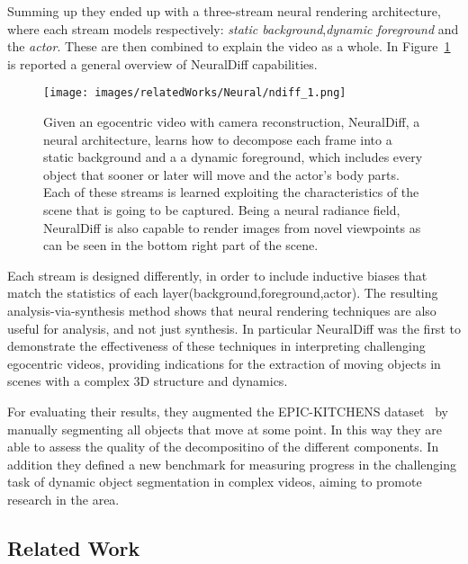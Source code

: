 Summing up they ended up with a three-stream neural rendering architecture, where each stream
models respectively: \textit{static background},\textit{dynamic foreground} and
the \textit{actor}. These are then combined to explain the video as a whole. In Figure~\ref{fig:ndiff_1}
is reported a general overview of NeuralDiff capabilities.
\begin{figure}[H]
    \centering
    \texttt{[image: images/relatedWorks/Neural/ndiff\_1.png]} 
    \caption{Given an egocentric video with camera reconstruction, NeuralDiff, a neural
    architecture, learns how to decompose each frame into a static background
    and a a dynamic foreground, which includes every object that sooner or later will move
    and the actor's body parts. Each of these streams is learned exploiting the characteristics
    of the scene that is going to be captured. Being a neural radiance field, NeuralDiff is 
    also capable to render images from novel viewpoints as can be seen in the bottom right part
    of the scene.}\label{fig:ndiff_1}
\end{figure}

Each stream is designed differently, in order to include inductive biases that match the statistics
of each layer(background,foreground,actor). The resulting analysis-via-synthesis method
shows that neural rendering techniques are also useful for analysis, and not just synthesis.
In particular NeuralDiff was the first to demonstrate the effectiveness of these techniques
in interpreting challenging egocentric videos, providing indications for the extraction of moving
objects in scenes with a complex 3D structure and dynamics.

For evaluating their results, they augmented the EPIC-KITCHENS dataset~\cite{EPICKITCHENS} by 
manually segmenting all objects that move at some point. In this way they are able to 
assess the quality of the decompositino of the different components. In addition they defined
a new benchmark for measuring progress in the challenging task of dynamic object segmentation
in complex videos, aiming to promote research in the area.

\subsection{Related Work}
